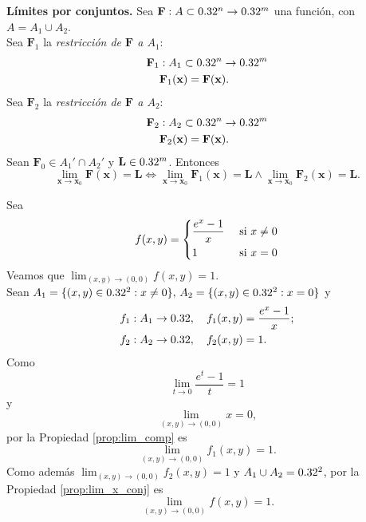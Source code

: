 \begin{propertie}\textbf{L\'imites por conjuntos.} \label{prop:lim_x_conj}
   Sea $\mathbf{F} : A \subset 0.32^n \to 0.32^m$ una funci\'on, con $A = A_1 \cup A_2$.\\
   Sea $\mathbf{F}_1$ la \emph{restricci\'on de $\mathbf{F}$ a $A_1$}:
 \begin{align*}
  \mathbf{F}_1 &: A_1 \subset 0.32^n \to 0.32^m \\
  &\mathbf{F}_1(\mathbf{x}) = \mathbf{F}(\mathbf{x}).
 \end{align*}
Sea $\mathbf{F}_2$ la \emph{restricci\'on de $\mathbf{F}$ a $A_2$}:
 \begin{align*}
  \mathbf{F}_2 &: A_2 \subset 0.32^n \to 0.32^m \\
  &\mathbf{F}_2(\mathbf{x}) = \mathbf{F}(\mathbf{x}).
 \end{align*}
 Sean $\mathbf{F}_0 \in A_1' \cap A_2'$ y $\mathbf{L} \in 0.32^m$. Entonces
 \[
  \lim_{\mathbf{x} \to \mathbf{x}_0} \mathbf{F}(\mathbf{x}) = \mathbf{L} \iff 
  \lim_{\mathbf{x} \to \mathbf{x}_0} \mathbf{F}_1(\mathbf{x}) = \mathbf{L} \wedge \lim_{\mathbf{x} \to \mathbf{x}_0} \mathbf{F}_2(\mathbf{x}) = \mathbf{L}.
 \]
\end{propertie}
\begin{example}
\mbox{}

 Sea 
  \[
   f(x,y) = 
     \begin{dcases}
        \dfrac{e^x - 1}{x}  & \text{ si } x \ne 0  \\
         1                 & \text{ si } x = 0
     \end{dcases}
  \]
 Veamos que $\lim_{(x,y) \to (0,0)} f(x,y) = 1$.\\
 Sean $A_1 = \{ (x,y) \in 0.32^2 : x \ne 0\}, \, A_2 = \{ (x,y) \in 0.32^2 : x = 0\}$ y 
 \begin{align*}
  f_1 &: A_1 \to 0.32,\quad f_1(x,y) = \frac{e^x - 1}{x}; \\
  f_2 &: A_2 \to 0.32,\quad f_2(x,y) = 1.
  \end{align*}
 Como 
 \[
    \lim_{t \to 0} \frac{e^t - 1}{t} = 1
 \]
 y 
 \[
    \lim_{(x,y) \to (0,0)} x = 0,
 \]
 por la Propiedad \ref{prop:lim_comp} es 
 \[
    \lim_{(x,y) \to (0,0)} f_1(x,y) = 1.
 \]
Como adem\'as $\lim_{(x,y) \to (0,0)} f_2(x,y) = 1$ y $A_1 \cup A_2 = 0.32^2$, por la Propiedad \ref{prop:lim_x_conj} es
 \[
  \lim_{(x,y) \to (0,0)} f(x,y) = 1.
 \]
\end{example}

